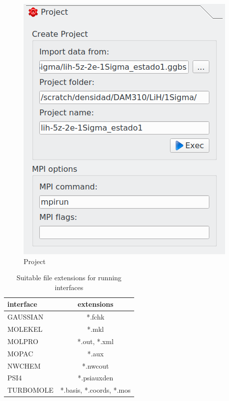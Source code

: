 \documentclass[10pt]{article}
\begin{document}
\begin{minipage}{.35\linewidth}
\vspace*{-2mm}
\begin{figure}[H]
\vspace*{-3mm}
\begin{center}
\includegraphics[width=.7\linewidth]{damqt320_project_menu.png}
\end{center}
\caption{Project \label{fig:2_1_2}}
\end{figure}
\end{minipage}
\hspace*{1cm}
\vspace*{5mm}
\begin{minipage}{.45\linewidth}
\begin{table}[H]
\begin{center}
\caption{\label{tab:2.1}Suitable file extensions for running interfaces}
\begin{tabular}{l|c}
interface & extensions \\
\hline
GAUSSIAN & *.fchk \\
MOLEKEL & *.mkl \\
MOLPRO & *.out, *.xml \\
MOPAC & *.aux \\
NWCHEM & *.nwcout \\
PSI4 & *.psiauxden \\
TURBOMOLE & *.basis, *.coords, *.mos \\
\hline
\end{tabular}
\end{center}
\end{table}
\end{minipage}
\end{document}
